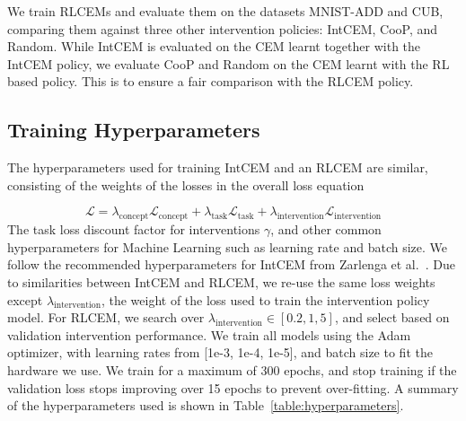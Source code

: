 We train RLCEMs and evaluate them on the datasets MNIST-ADD and CUB, 
comparing them against three other intervention policies:
IntCEM, CooP, and Random. While IntCEM is evaluated on the
CEM learnt together with the IntCEM policy,
we evaluate CooP and Random on the CEM learnt 
with the RL based policy. This is to ensure a fair comparison
with the RLCEM policy.

\subsection{Training Hyperparameters}

The hyperparameters used for training IntCEM and an RLCEM are similar,
consisting of the weights of the losses in the overall loss equation

\[\mathcal{L} = \lambda_{\text{concept}} \mathcal{L}_{\text{concept}}
+  \lambda_{\text{task}} \mathcal{L}_{\text{task}}
+  \lambda_{\text{intervention}} \mathcal{L}_{\text{intervention}}\]
The task loss discount factor for interventions $\gamma$,
and other common hyperparameters for Machine Learning such as learning rate
and batch size.
We follow the recommended hyperparameters 
for IntCEM from Zarlenga et al.~\cite{intcem}. 
Due 
to similarities between IntCEM and RLCEM, we re-use
the same loss weights except $\lambda_{\text{intervention}}$,
the weight of the loss used to train the intervention policy model.
For RLCEM, we search over $\lambda_{\text{intervention}} \in [0.2, 1, 5]$, and select based on validation
intervention performance.
We train all models using the Adam~\cite{adam} optimizer, with learning rates
from [1e-3, 1e-4, 1e-5], and 
batch size to fit the hardware we use.
We train for a maximum of 300 epochs,
and stop training if the validation loss stops improving over 15 epochs
to prevent over-fitting.
A summary of the hyperparameters used is shown in 
Table~\ref{table:hyperparameters}.

